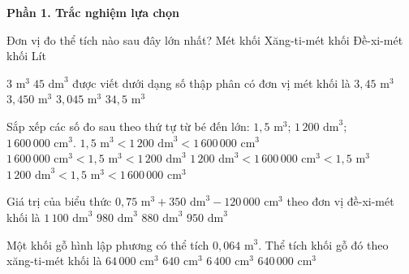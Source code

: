 \textbf{Phần 1. Trắc nghiệm lựa chọn}

\begin{ex} %
Đơn vị đo thể tích nào sau đây lớn nhất?
\choice
{\True Mét khối}
{Xăng-ti-mét khối}
{Đề-xi-mét khối}
{Lít}
\end{ex}

\begin{ex} %
$3\text{ m}^3\; 45\text{ dm}^3$ được viết dưới dạng số thập phân có đơn vị mét khối là
\choice
{$3{,}45\text{ m}^3$}
{$3{,}450\text{ m}^3$}
{\True $3{,}045\text{ m}^3$}
{$34{,}5\text{ m}^3$}
\end{ex}

\begin{ex} %
Sắp xếp các số đo sau theo thứ tự từ bé đến lớn: $1{,}5\text{ m}^3$; $1\,200\text{ dm}^3$; $1\,600\,000\text{ cm}^3$.
\choice
{$1{,}5\text{ m}^3 < 1\,200\text{ dm}^3 < 1\,600\,000\text{ cm}^3$}
{$1\,600\,000\text{ cm}^3 < 1{,}5\text{ m}^3 < 1\,200\text{ dm}^3$}
{$1\,200\text{ dm}^3 < 1\,600\,000\text{ cm}^3 < 1{,}5\text{ m}^3$}
{\True $1\,200\text{ dm}^3 < 1{,}5\text{ m}^3 < 1\,600\,000\text{ cm}^3$}
\end{ex}

\begin{ex} %
Giá trị của biểu thức $0{,}75\text{ m}^3 + 350\text{ dm}^3 - 120\,000\text{ cm}^3$ theo đơn vị đề-xi-mét khối là
\choice
{$1\,100\text{ dm}^3$}
{\True $980\text{ dm}^3$}
{$880\text{ dm}^3$}
{$950\text{ dm}^3$}
\end{ex}

\begin{ex} %
Một khối gỗ hình lập phương có thể tích $0{,}064\text{ m}^3$. Thể tích khối gỗ đó theo xăng-ti-mét khối là
\choice
{\True $64\,000\text{ cm}^3$}
{$640\text{ cm}^3$}
{$6\,400\text{ cm}^3$}
{$640\,000\text{ cm}^3$}
\end{ex}

